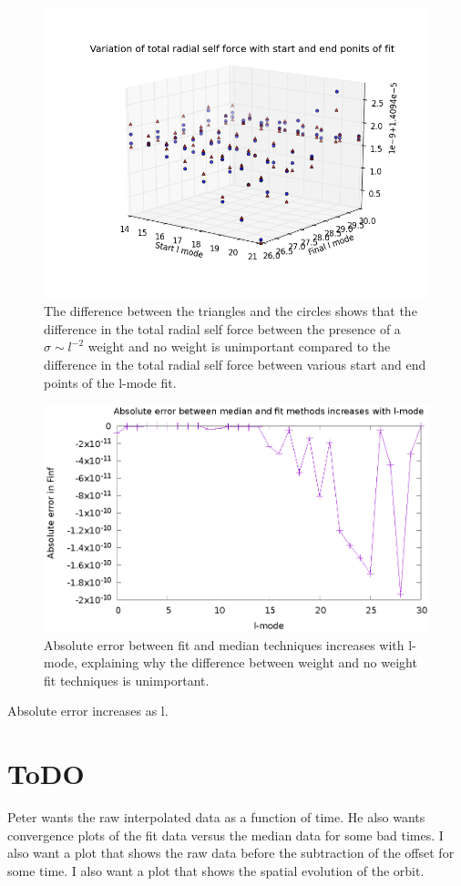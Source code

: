 \begin{figure}
  \includegraphics{3Dscatterwithwithoutsigmalminlmax}
  \caption{The difference between the triangles and the circles shows that the difference in the total radial self force between the presence of a $\sigma\sim l^{-2}$ weight and no weight is unimportant compared to the difference in the total radial self force between various start and end points of the l-mode fit.}
\end{figure}

\begin{figure}
  \includegraphics{absErrorIncreaseslmode}
  \caption{Absolute error between fit and median techniques increases with l-mode, explaining why the difference between weight and no weight fit techniques is unimportant.}
\end{figure}

Absolute error increases as l. 


\section{ToDO}
Peter wants the raw interpolated data as a function of time. He also wants convergence plots of the fit data versus the median data for some bad times. I also want a plot that shows the raw data before the subtraction of the offset for some time. I also want a plot that shows the spatial evolution of the orbit.
